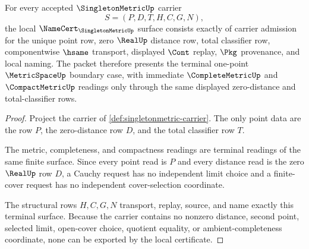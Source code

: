 \begin{theorem}
\label{thm:singletonmetric-namecert-obligations}
For every accepted $\SingletonMetricUp$ carrier
$$
S=(P,D,T,H,C,G,N),
$$
the local $\NameCert_{\SingletonMetricUp}$ surface consists exactly of carrier admission for the unique point row, zero $\RealUp$ distance row, total classifier row, componentwise $\hsame$ transport, displayed $\Cont$ replay, $\Pkg$ provenance, and local naming. The packet therefore presents the terminal one-point $\MetricSpaceUp$ boundary case, with immediate $\CompleteMetricUp$ and $\CompactMetricUp$ readings only through the same displayed zero-distance and total-classifier rows.
\end{theorem}
\begin{proof}
Project the carrier of \autoref{def:singletonmetric-carrier}. The only point data are the row $P$, the zero-distance row $D$, and the total classifier row $T$.

The metric, completeness, and compactness readings are terminal readings of the same finite surface. Since every point read is $P$ and every distance read is the zero $\RealUp$ row $D$, a Cauchy request has no independent limit choice and a finite-cover request has no independent cover-selection coordinate.

The structural rows $H,C,G,N$ transport, replay, source, and name exactly this terminal surface. Because the carrier contains no nonzero distance, second point, selected limit, open-cover choice, quotient equality, or ambient-completeness coordinate, none can be exported by the local certificate.
\end{proof}

\begin{closurestatus}{\SingletonMetricUp}
  \theoryclosure{\seedClosure}
  \formalstatus{\unformalizedV}
\end{closurestatus}
